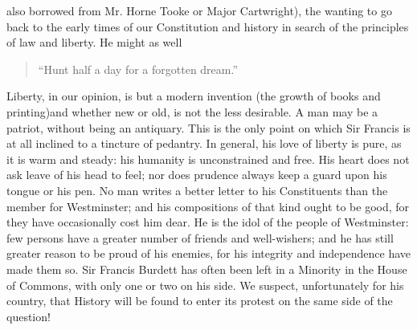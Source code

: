 also borrowed from Mr. Horne Tooke or Major Cartwright), the
wanting to go back to the early times of our Constitution and
history in search of the principles of law and liberty. He might
as well
\begin{quote}
  ``Hunt half a day for a forgotten dream.''

\end{quote}
Liberty, in our opinion, is but a modern invention (the growth of
books and printing)\textemdash and whether new or old, is not the
less desirable. A man may be a patriot, without being an
antiquary. This is the only point on which Sir Francis is at all
inclined to a tincture of pedantry. In general, his love of
liberty is pure, as it is warm and steady: his humanity is
unconstrained and free. His heart does not ask leave of his head
to feel; nor does prudence always keep a guard upon his tongue or
his pen. No man writes a better letter to his Constituents than
the member for Westminster; and his compositions of that kind
ought to be good, for they have occasionally cost him dear. He is
the idol of the people of Westminster: few persons have a greater
number of friends and well-wishers; and he has still greater
reason to be proud of his enemies, for his integrity and
independence have made them so. Sir Francis Burdett has often been
left in a Minority in the House of Commons, with only one or two
on his side. We suspect, unfortunately for his country, that
History will be found to enter its protest on the same side of the
question!
